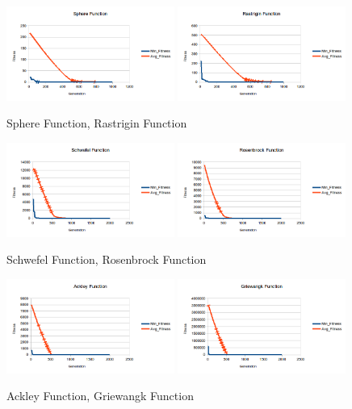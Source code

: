\documentclass[b5paper,11pt, abstraction, titlepage]{scrartcl}
\begin{document}
\begin{CJK}{UTF8}{gbsn}
\begin{figure}
  \centering
  \includegraphics[width=0.49\textwidth]{sph}
  \includegraphics[width=0.49\textwidth]{ras}
  \caption{Sphere Function, Rastrigin Function}
\end{figure}
\begin{figure}
  \centering
  \includegraphics[width=0.49\textwidth]{sch}
  \includegraphics[width=0.49\textwidth]{ros}
  \caption{Schwefel Function, Rosenbrock Function}
\end{figure}
\begin{figure}
  \centering
  \includegraphics[width=0.49\textwidth]{ack}
  \includegraphics[width=0.49\textwidth]{gri}
  \caption{Ackley Function, Griewangk Function}
\end{figure}


\end{CJK}
\end{document}
